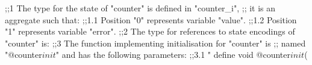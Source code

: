 \documentclass[10pt,a4paper]{article}
\begin{document}
\begin{llvmcode}
;;1 The type for the state of "counter" is defined in "counter_i",
;; it is an aggregate such that:
;;1.1 Position "0" represents variable "value".
;;1.2 Position "1" represents variable "error".
;;2 The type for references to state encodings of "counter" is:
;;3 The function implementing initialisation for "counter" is
;;  named "@counter$init$" and has the following parameters:
;;3.1 "%
define void @counter$init$(%
\end{llvmcode}
\end{document}
